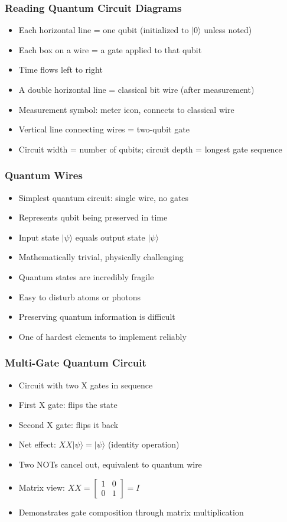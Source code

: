 \begin{frame}[fragile]\frametitle{Reading Quantum Circuit Diagrams}
\begin{itemize}
\item Each horizontal line = one qubit (initialized to $|0\rangle$ unless noted)
\item Each box on a wire = a gate applied to that qubit
\item Time flows left to right
\item A double horizontal line = classical bit wire (after measurement)
\item Measurement symbol: meter icon, connects to classical wire
\item Vertical line connecting wires = two-qubit gate
\item Circuit width = number of qubits; circuit depth = longest gate sequence
\end{itemize}
\end{frame}

\begin{frame}[fragile]\frametitle{Quantum Wires}
\begin{itemize}
\item Simplest quantum circuit: single wire, no gates
\item Represents qubit being preserved in time
\item Input state $|\psi\rangle$ equals output state $|\psi\rangle$
\item Mathematically trivial, physically challenging
\item Quantum states are incredibly fragile
\item Easy to disturb atoms or photons
\item Preserving quantum information is difficult
\item One of hardest elements to implement reliably
\end{itemize}
\end{frame}

\begin{frame}[fragile]\frametitle{Multi-Gate Quantum Circuit}
\begin{itemize}
\item Circuit with two X gates in sequence
\item First X gate: flips the state
\item Second X gate: flips it back
\item Net effect: $XX|\psi\rangle = |\psi\rangle$ (identity operation)
\item Two NOTs cancel out, equivalent to quantum wire
\item Matrix view: $XX = \begin{bmatrix} 1 & 0 \\ 0 & 1 \end{bmatrix} = I$
\item Demonstrates gate composition through matrix multiplication
\end{itemize}
\end{frame}

